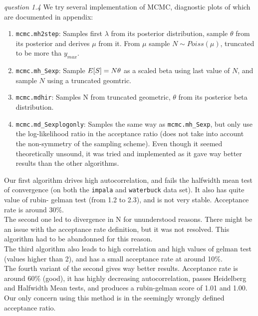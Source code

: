 \documentclass[twoside]{article}
\begin{document}
\vspace{.2 in}
\textit{question 1.4} We try several implementation of MCMC, diagnostic plots of which are documented in appendix:
\begin{enumerate}
\item \texttt{mcmc.mh2step}: Samples first $\lambda$ from its posterior distribution, sample $\theta$ from its posterior and derives $\mu$ from it. From $\mu$ sample $N \sim Poiss(\mu)$, truncated to be more tha $y_{max}$.
\item \texttt{mcmc.mh\_Sexp}: Sample $E[S] = N \* \theta$ as a scaled beta using last value of $N$, and sample $N$ using a truncated geomtric.
\item \texttt{mcmc.mdhir}: Samples N from truncated geometric, $\theta$ from its posterior beta distribution.
\item \texttt{mcmc.md\_Sexplogonly}: Samples the same way as \texttt{mcmc.mh\_Sexp}, but only use the log-likelihood ratio in the acceptance ratio (does not take into account the non-symmetry of the sampling scheme). Even though it seemed theoretically unsound, it was tried and implemented as it gave way better results than the other algorithms.
\end{enumerate}

Our first algorithm drives high autocorrelation, and fails the halfwidth mean test of convergence (on both the \texttt{impala} and \texttt{waterbuck} data set). It also has quite value of rubin-
gelman test (from 1.2 to 2.3), and is not very stable. Acceptance rate is around 30\%.\\

The second one led to divergence in N for ununderstood reasons. There might be an issue with the acceptance rate definition, but it was not resolved. This algorithm had to be abandonned for this reason.\\

The third algorithm also leads to high correlation and high values of gelman test (values higher than 2), and has a small acceptance rate at around 10\%.\\

The fourth variant of the second gives way better results. Acceptance rate is around 60\% (good), it has highly decreasing autocorrelation, passes Heidelberg and Halfwidth Mean tests, and produces a rubin-gelman score of 1.01 and 1.00. Our only concern using this method is in the seemingly wrongly defined acceptance ratio.\\
\end{document}

